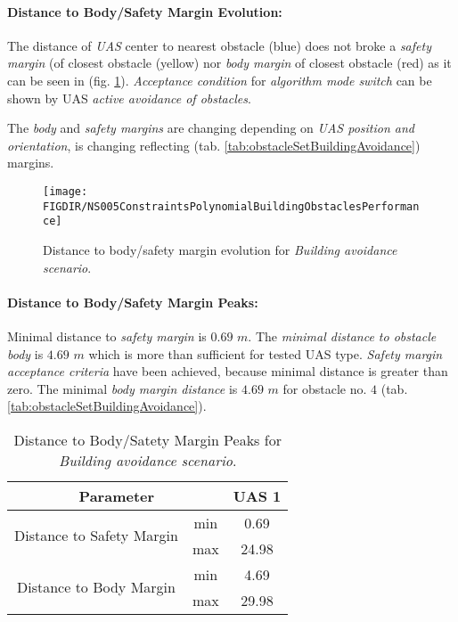 \noindent\paragraph{Distance to Body/Safety Margin Evolution:} The distance of \emph{UAS} center to nearest obstacle (blue) does not broke a \emph{safety margin} (of closest obstacle (yellow)  nor \emph{body margin} of closest obstacle (red) as it can be seen in (fig. \ref{fig:testCaseBuildingAvoidancePerformance}). \emph{Acceptance condition} for \emph{algorithm mode switch} can be shown by UAS \emph{active avoidance of obstacles}.

\begin{note}
The \emph{body} and \emph{safety margins} are changing depending on \emph{UAS position and orientation}, is changing reflecting (tab. \ref{tab:obstacleSetBuildingAvoidance}) margins. 
\end{note}


\begin{figure}[H]
	\centering
	\texttt{[image: \\FIGDIR/NS005ConstraintsPolynomialBuildingObstaclesPerformance]} 
	\caption{Distance to body/safety margin evolution for \emph{Building avoidance scenario}.}
	\label{fig:testCaseBuildingAvoidancePerformance}
\end{figure}


\noindent\paragraph{Distance to Body/Safety Margin Peaks:} Minimal distance to \emph{safety margin} is $0.69$ $m$. The \emph{minimal distance to obstacle body} is $4.69$ $m$ which is more than sufficient for tested UAS type. \emph{Safety margin acceptance criteria} have been achieved, because minimal distance is greater than zero. The minimal \emph{body margin distance} is $4.69$ $m$ for obstacle no. $4$ (tab. \ref{tab:obstacleSetBuildingAvoidance}).

\begin{table}[H]
	\centering
	\begin{tabular}{c|c||c}
	\multicolumn{2}{c||}{Parameter} & UAS 1 \\\hline\hline
	\multirow{2}{*}{Distance to Safety Margin} & min & 0.69  \\\cline{2-3}
											& max & 24.98 \\\hline
	\multirow{2}{*}{Distance to Body Margin}   & min & 4.69  \\\cline{2-3}
											& max & 29.98 
	\end{tabular}
	\caption{Distance to Body/Satety Margin Peaks for \emph{Building avoidance scenario}.}
	\label{tab:testCaseBuildingAvoidanceSafetyAndBodyMarginDistances}
\end{table}

